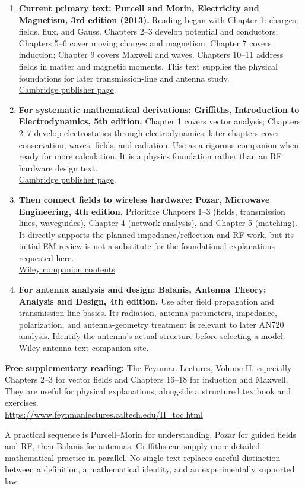 \documentclass[11pt,letterpaper]{article}
\begin{document}
\begin{enumerate}
\item \textbf{Current primary text: Purcell and Morin, Electricity and Magnetism, 3rd edition (2013).} Reading began with Chapter 1: charges, fields, flux, and Gauss. Chapters 2--3 develop potential and conductors; Chapters 5--6 cover moving charges and magnetism; Chapter 7 covers induction; Chapter 9 covers Maxwell and waves. Chapters 10--11 address fields in matter and magnetic moments. This text supplies the physical foundations for later transmission-line and antenna study.\\
\href{https://www.cambridge.org/za/titles/electricity-and-magnetism-3rd-edition}{Cambridge publisher page}.
\item \textbf{For systematic mathematical derivations: Griffiths, Introduction to Electrodynamics, 5th edition.} Chapter 1 covers vector analysis; Chapters 2--7 develop electrostatics through electrodynamics; later chapters cover conservation, waves, fields, and radiation. Use as a rigorous companion when ready for more calculation. It is a physics foundation rather than an RF hardware design text.\\
\href{https://www.cambridge.org/highereducation/books/introduction-to-electrodynamics/FD23E188E2BDCDB40199CFE3386EC08F}{Cambridge publisher page}.
\item \textbf{Then connect fields to wireless hardware: Pozar, Microwave Engineering, 4th edition.} Prioritize Chapters 1--3 (fields, transmission lines, waveguides), Chapter 4 (network analysis), and Chapter 5 (matching). It directly supports the planned impedance/reflection and RF work, but its initial EM review is not a substitute for the foundational explanations requested here.\\
\href{https://bcs.wiley.com/he-bcs/Books?action=contents&bcsId=6874&itemId=0470631554}{Wiley companion contents}.
\item \textbf{For antenna analysis and design: Balanis, Antenna Theory: Analysis and Design, 4th edition.} Use after field propagation and transmission-line basics. Its radiation, antenna parameters, impedance, polarization, and antenna-geometry treatment is relevant to later AN720 analysis. Identify the antenna's actual structure before selecting a model.\\
\href{https://bcs.wiley.com/he-bcs/Books?action=contents&bcsId=9777&itemId=1118642066}{Wiley antenna-text companion site}.
\end{enumerate}

\textbf{Free supplementary reading:} The Feynman Lectures, Volume II, especially Chapters 2--3 for vector fields and Chapters 16--18 for induction and Maxwell. They are useful for physical explanations, alongside a structured textbook and exercises.\\
\url{https://www.feynmanlectures.caltech.edu/II_toc.html}

A practical sequence is Purcell--Morin for understanding, Pozar for guided fields and RF, then Balanis for antennas. Griffiths can supply more detailed mathematical practice in parallel. No single text replaces careful distinction between a definition, a mathematical identity, and an experimentally supported law.
\end{document}
